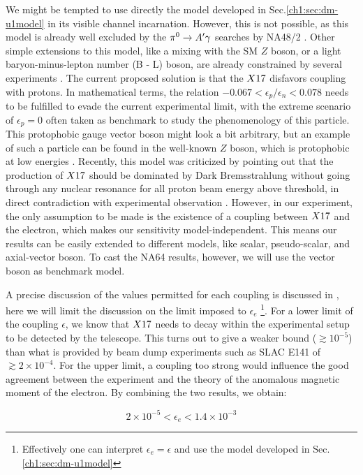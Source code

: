 We might be tempted to use directly the model developed in Sec.\ref{ch1:sec:dm-u1model} in its visible channel incarnation. However, this is not possible, as this model is already well excluded by the $\pi^0 \to A' \gamma$ searches by NA48/2 \cite{na48}. Other simple extensions to this model, like a mixing with the SM $Z$ boson, or a light baryon-minus-lepton number (B - L) boson, are already constrained by several experiments \cite{PhysRevD.95.035017}. The current proposed solution is that the $X17$ disfavors coupling with protons. In mathematical terms, the relation $-0.067 < \epsilon_p/\epsilon_n < 0.078$ needs to be fulfilled to evade the current experimental limit, with the extreme scenario of $\epsilon_p = 0$ often taken as benchmark to study the phenomenology of this particle. This protophobic gauge vector boson might look a bit arbitrary, but an example of such a particle can be found in the well-known $Z$ boson, which is protophobic at low energies \cite{PhysRevD.95.035017}. Recently, this model was criticized by pointing out that the production of $X17$ should be dominated by Dark Bremsstrahlung without going through any nuclear resonance for all proton beam energy above threshold, in direct contradiction with experimental observation \cite{zhang2020protophobic}.  However, in our experiment, the only assumption to be made is the existence of a coupling between $X17$ and the electron, which makes our sensitivity model-independent. This means our results can be easily extended to different models, like scalar, pseudo-scalar, and axial-vector boson. To cast the NA64 results, however, we will use the vector boson as benchmark model.

A precise discussion of the values permitted for each coupling is discussed in \cite{Feng:2016jff,PhysRevD.95.035017}, here we will limit the discussion on the limit imposed to $\epsilon_e$ \footnote{Effectively one can interpret $\epsilon_e = \epsilon$ and use the model developed in Sec.\ref{ch1:sec:dm-u1model}}. For a lower limit of the coupling $\epsilon$, we know that $X17$ needs to decay within the experimental setup to be detected by the telescope. This turns out to give a weaker bound ($\gtrsim 10^{-5}$) than what is provided by beam dump experiments such as SLAC E141 \cite{blum} of $\gtrsim 2 \times 10^{-4}$. For the upper limit, a coupling too strong would influence the good agreement between the experiment and the theory of the anomalous magnetic moment of the electron. By combining the two results, we obtain:

\begin{equation}
  \label{eq:x17-limits}
  2 \times 10^{-5} < \epsilon_e < 1.4 \times 10^{-3}
\end{equation}

